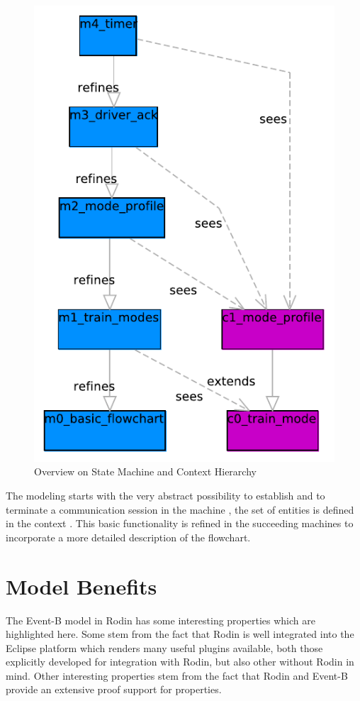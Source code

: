 \documentclass{template/openetcs_article}
\begin{document}
\begin{figure}[ht]
  \centering
  \includegraphics[width=.5\textwidth]{SubSet_026_5_9}
  \caption{Overview on State Machine and Context Hierarchy}
  \label{fig:model-overview}
\end{figure}

The modeling starts with the very abstract possibility to establish and to
terminate a communication session in the machine , the set of
entities is defined in the context . This basic functionality is
refined in the succeeding machines to incorporate a more detailed description of
the flowchart.

\section{Model Benefits}
\label{sec:model-highlights}

The Event-B model in Rodin has some interesting properties which are highlighted
here. Some stem from the fact that Rodin is well integrated into the Eclipse
platform which renders many useful plugins available, both those explicitly
developed for integration with Rodin, but also other without Rodin in mind.
Other interesting properties stem from the fact that Rodin and Event-B provide
an extensive proof support for properties.
\end{document}
